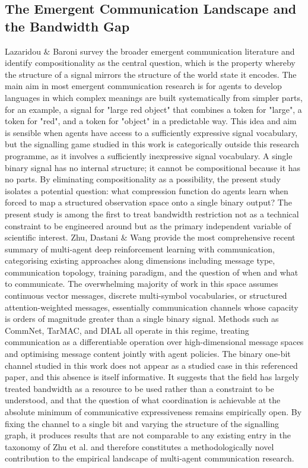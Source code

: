 \documentclass[a4paper,twoside,12pt]{report}
\begin{document}
    \subsection*{The Emergent Communication Landscape and the Bandwidth Gap}
    Lazaridou $\&$ Baroni \citeyearpar{lazaridou2020} survey the broader emergent communication literature and identify compositionality as the central question, which is the property whereby the structure of a signal mirrors the structure of the world state it encodes. The main aim in most emergent communication research is for agents to develop languages in which complex meanings are built systematically from simpler parts, for an example, a signal for "large red object" that combines a token for "large", a token for "red", and a token for "object" in a predictable way. This idea and aim is sensible when agents have access to a sufficiently expressive signal vocabulary, but the signalling game studied in this work is categorically outside this research programme, as it involves a sufficiently inexpressive signal vocabulary. A single binary signal has no internal structure; it cannot be compositional because it has no parts. By eliminating compositionality as a possibility, the present study isolates a potential question: what compression function do agents learn when forced to map a structured observation space onto a single binary output? The present study is among the first to treat bandwidth restriction not as a technical constraint to be engineered around but as the primary independent variable of scientific interest.
    \newline
    \newline
    Zhu, Dastani $\&$ Wang \citeyearpar{zhu2024} provide the most comprehensive recent summary of multi-agent deep reinforcement learning with communication, categorising existing approaches along dimensions including message type, communication topology, training paradigm, and the question of when and what to communicate. The overwhelming majority of work in this space assumes continuous vector messages, discrete multi-symbol vocabularies, or structured attention-weighted messages, essentially communication channels whose capacity is orders of magnitude greater than a single binary signal. Methods such as CommNet, TarMAC, and DIAL all operate in this regime, treating communication as a differentiable operation over high-dimensional message spaces and optimising message content jointly with agent policies. The binary one-bit channel studied in this work does not appear as a studied case in this referenced paper, and this absence is itself informative. It suggests that the field has largely treated bandwidth as a resource to be used rather than a constraint to be understood, and that the question of what coordination is achievable at the absolute minimum of communicative expressiveness remains empirically open. By fixing the channel to a single bit and varying the structure of the signalling graph, it produces results that are not comparable to any existing entry in the taxonomy of Zhu et al. and therefore constitutes a methodologically novel contribution to the empirical landscape of multi-agent communication research.
    \newline
    
\end{document}
